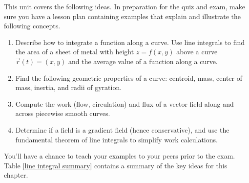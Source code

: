 \noindent 
This unit covers the following ideas. In preparation for the quiz and exam, make sure you have a lesson plan containing examples that explain and illustrate the following concepts.  
\begin{enumerate}
\item Describe how to integrate a function along a curve. Use line integrals to find the area of a sheet of metal with height $z=f(x,y)$ above a curve $\vec r(t)=\left(x,y\right)$ and the average value of a function along a curve.
\item Find the following geometric properties of a curve: centroid, mass, center of mass, inertia, and radii of gyration.
\item Compute the work (flow, circulation) and flux of a vector field along and across piecewise smooth curves.
\item Determine if a field is a gradient field (hence conservative), and use the fundamental theorem of line integrals to simplify work calculations.
\end{enumerate}
You'll have a chance to teach your examples to your peers prior to the exam. Table \ref{line integral summary} contains a summary of the key ideas for this chapter. 


